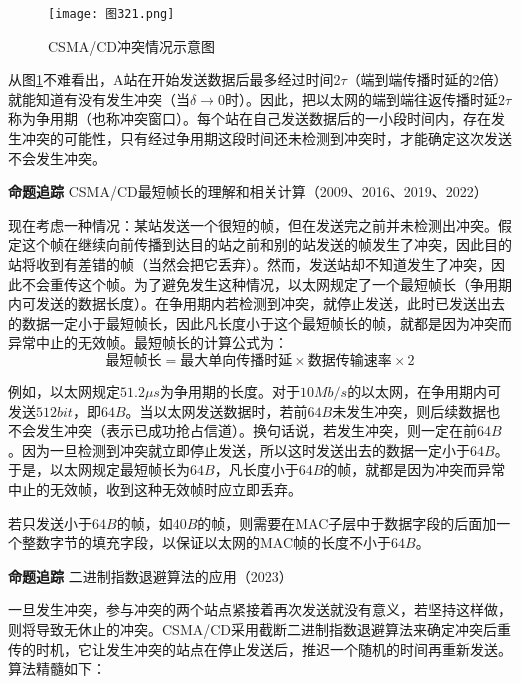 \documentclass{ctexbook}
\begin{document}
	
	
	\begin{figure}[h]
		\centering
		\caption{CSMA/CD冲突情况示意图}
		\label{fig:csma_cd_collision}
		\texttt{[image: 图321.png]} %
	\end{figure}
	
	从图\ref{fig:csma_cd_collision}不难看出，A站在开始发送数据后最多经过时间$2\tau$（端到端传播时延的2倍）就能知道有没有发生冲突（当$\delta \to 0$时）。因此，把以太网的端到端往返传播时延$2\tau$称为争用期（也称冲突窗口）。每个站在自己发送数据后的一小段时间内，存在发生冲突的可能性，只有经过争用期这段时间还未检测到冲突时，才能确定这次发送不会发生冲突。
	
	\begin{tcolorbox}[colframe=black, colback=white]
		\kaishu \textbf{命题追踪} \quad CSMA/CD最短帧长的理解和相关计算（2009、2016、2019、2022）
	\end{tcolorbox}
	
	现在考虑一种情况：某站发送一个很短的帧，但在发送完之前并未检测出冲突。假定这个帧在继续向前传播到达目的站之前和别的站发送的帧发生了冲突，因此目的站将收到有差错的帧（当然会把它丢弃）。然而，发送站却不知道发生了冲突，因此不会重传这个帧。为了避免发生这种情况，以太网规定了一个最短帧长（争用期内可发送的数据长度）。在争用期内若检测到冲突，就停止发送，此时已发送出去的数据一定小于最短帧长，因此凡长度小于这个最短帧长的帧，就都是因为冲突而异常中止的无效帧。最短帧长的计算公式为：
	\[ \text{最短帧长} = \text{最大单向传播时延} \times \text{数据传输速率} \times 2 \]
	
	例如，以太网规定$51.2\mu s$为争用期的长度。对于$10Mb/s$的以太网，在争用期内可发送$512bit$，即$64B$。当以太网发送数据时，若前$64B$未发生冲突，则后续数据也不会发生冲突（表示已成功抢占信道）。换句话说，若发生冲突，则一定在前$64B$。因为一旦检测到冲突就立即停止发送，所以这时发送出去的数据一定小于$64B$。于是，以太网规定最短帧长为$64B$，凡长度小于$64B$的帧，就都是因为冲突而异常中止的无效帧，收到这种无效帧时应立即丢弃。
	
	若只发送小于$64B$的帧，如$40B$的帧，则需要在MAC子层中于数据字段的后面加一个整数字节的填充字段，以保证以太网的MAC帧的长度不小于$64B$。
	
	\begin{tcolorbox}[colframe=black, colback=white]
		\kaishu \textbf{命题追踪} \quad 二进制指数退避算法的应用（2023）
	\end{tcolorbox}
	
	一旦发生冲突，参与冲突的两个站点紧接着再次发送就没有意义，若坚持这样做，则将导致无休止的冲突。CSMA/CD采用截断二进制指数退避算法来确定冲突后重传的时机，它让发生冲突的站点在停止发送后，推迟一个随机的时间再重新发送。算法精髓如下：
	
\end{document}
